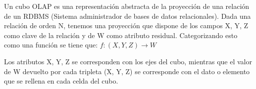 \documentclass{fancyslides}
\begin{document}
\begin{frame}
\misc
{
Un cubo OLAP es una representación abstracta de la proyección de una relación de un RDBMS (Sistema administrador de bases de datos relacionales).
Dada una relación de orden N, tenemos una proyección que dispone de los campos X, Y, Z como clave de la relación y de W como atributo residual.
Categorizando esto como una función se tiene que:
$f : (X,Y,Z) \rightarrow  W$

Los atributos X, Y, Z se corresponden con los ejes del cubo, mientras que el valor de W devuelto por cada tripleta (X, Y, Z) se corresponde con el dato o elemento que se rellena en cada celda del cubo.

}
\end{frame}
\end{document}

